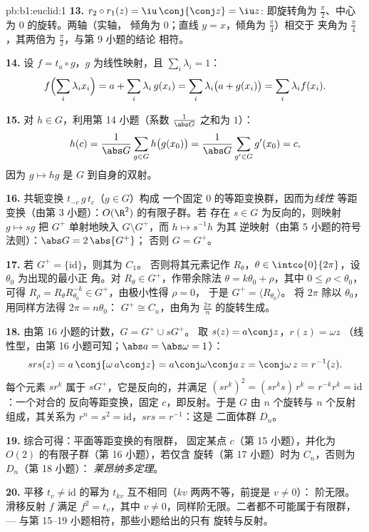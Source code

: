 \begin{solution}{pb:b1:euclid:1}
\textbf{13.} $r_2\circ r_1(z) = \iu\,\conj{\conj z} = \iu z$:
即旋转角为 $\frac\pi2$、中心为 $0$ 的旋转。两轴（实轴，
倾角为 $0$；直线 $y = x$，倾角为 $\frac\pi4$）相交于
夹角为 $\frac\pi4$，其两倍为 $\frac\pi2$，与第 9 小题的结论
相符。

\textbf{14.} 设 $f = t_a\circ g$，$g$ 为线性映射，且 $\sum_i
\lambda_i = 1$：
\[
f\Bigl(\sum_i \lambda_i x_i\Bigr)
= a + \sum_i \lambda_i\,g(x_i)
= \sum_i \lambda_i\bigl(a + g(x_i)\bigr)
= \sum_i \lambda_i f(x_i) .
\]

\textbf{15.} 对 $h \in G$，利用第 14 小题（系数
$\frac1{\abs G}$ 之和为 $1$）：
\[
h(c) = \frac{1}{\abs G}\sum_{g \in G} h\bigl(g(x_0)\bigr)
= \frac{1}{\abs G}\sum_{g' \in G} g'(x_0) = c ,
\]
因为 $g \mapsto hg$ 是 $G$ 到自身的双射。

\textbf{16.} 共轭变换 $t_{-c}\,g\,t_{c}$（$g \in G$）构成
一个固定 $0$ 的等距变换群，因而为\emph{线性}
等距变换（由第 3 小题）：$O(\R^2)$ 的有限子群。若
存在 $s \in G$ 为反向的，则映射 $g \mapsto sg$ 把 $G^+$
单射地映入 $G\setminus G^+$，而 $h \mapsto s^{-1}h$ 为其
逆映射（由第 5 小题的符号法则）：$\abs G = 2\,\abs{G^+}$；
否则 $G = G^+$。

\textbf{17.} 若 $G^{+} = \{\mathrm{id}\}$，则其为 $C_1$。
否则将其元素记作 $R_\theta$，$\theta \in
\intco{0}{2\pi}$，设 $\theta_0$ 为出现的最小正
角。对 $R_\theta \in G^{+}$，作带余除法
$\theta = k\theta_0 + \rho$，其中 $0 \leq \rho < \theta_0$，可得
$R_\rho = R_\theta R_{\theta_0}^{-k} \in G^{+}$，由极小性得 $\rho = 0$，
于是 $G^{+} = \langle R_{\theta_0}\rangle$。
将 $2\pi$ 除以 $\theta_0$，用同样方法得 $2\pi = n\theta_0$：
$G^{+} \cong C_n$，由角为
$\frac{2\pi}n$ 的旋转生成。

\textbf{18.} 由第 16 小题的计数，$G = G^{+} \cup sG^{+}$。
取 $s(z) = a\conj z$，$r(z) = \omega z$
（线性型，由第 16 小题可知；$\abs a = \abs\omega = 1$）：
\[
s r s(z) = a\,\conj{\omega\,a\conj z}
= a\conj\omega\conj a\,z = \conj\omega\,z = r^{-1}(z) .
\]
每个元素 $sr^k$ 属于 $sG^{+}$，它是反向的，并满足
$(sr^k)^2 = (sr^ks)\,r^k = r^{-k}r^k = \mathrm{id}$：一个对合的
反向等距变换，固定 $c$，即反射。于是
$G$ 由 $n$ 个旋转与 $n$ 个反射组成，其关系为
$r^n = s^2 = \mathrm{id}$，$srs = r^{-1}$：这是
二面体群 $D_n$。

\textbf{19.} 综合可得：平面等距变换的有限群，
固定某点 $c$（第 15 小题），并化为
$O(2)$ 的有限子群（第 16 小题），若仅含
旋转（第 17 小题）时为 $C_n$，否则为 $D_n$（第 18 小题）：
\emph{莱昂纳多定理}。

\textbf{20.} 平移 $t_v \neq \mathrm{id}$ 的幂为
$t_{kv}$ 互不相同（$kv$ 两两不等，前提是 $v \neq 0$）：
阶无限。滑移反射 $f$ 满足 $f^2 = t_v$，其中 $v
\neq 0$，同样阶无限。二者都不可能属于有限群，
--- 与第 15--19 小题相符，那些小题给出的只有
旋转与反射。


\end{solution}
